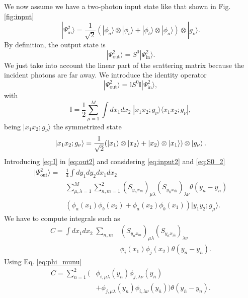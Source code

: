 \documentclass[notitlepage, prx, preprint, amsmath,superscriptaddress,amssymb]{revtex4-1}
\begin{document}
We now assume we have a two-photon input state like that shown in Fig. \ref{fig:input}
\begin{equation}\label{eq:input2}
|\Psi_\text{in}^2\rangle = \frac{1}{\sqrt{2}}(|\phi_a\rangle\otimes|\phi_b\rangle+|\phi_b\rangle\otimes|\phi_a\rangle)\otimes|g_\nu\rangle.
\end{equation}
By definition, the output state is
\begin{equation}
|\Psi_\text{out}^2\rangle = S^0|\Psi_\text{in}^2\rangle.
\end{equation}
We just take into account the linear part of the scattering matrix because the incident photons are far away. We introduce the identity operator
\begin{equation}\label{eq:out2}
|\Psi_\text{out}^2\rangle = \mathbb{I}S^0\mathbb{I}|\Psi_\text{in}^2\rangle,
\end{equation}
with
\begin{equation}\label{eq:I}
\mathbb{I}=\frac{1}{2}\sum_{\mu=1}^M \int dx_1dx_2\;|x_1x_2;g_\nu\rangle \langle x_1x_2;g_\nu|,
\end{equation}
being $|x_1x_2;g_\nu\rangle$ the symmetrized state
\begin{equation}
|x_1x_2;g_\nu\rangle=\frac{1}{\sqrt{2}}(|x_1\rangle\otimes|x_2\rangle + |x_2\rangle\otimes|x_1\rangle)\otimes \ket{g_\nu}.
\end{equation}
Introducing \eqref{eq:I} in \eqref{eq:out2} and considering \eqref{eq:input2} and \eqref{eq:S0_2}
\begin{align}\label{eq:out2_2}
|\Psi_\text{out}^2\rangle = &\frac{1}{4}\int dy_1dy_2dx_1dx_2\nonumber\\
&\sum_{\mu,\lambda=1}^M\sum_{n,m=1}^2(S_{y_nx_m})_{\mu\lambda} (S_{y_{\overline{n}}x_{\overline{m}}})_{\lambda\nu}\theta(y_{\overline{n}}-y_n)\nonumber\\
&(\phi_a(x_1)\phi_b(x_2)+\phi_a(x_2)\phi_b(x_1))|y_1y_2;g_\mu\rangle.
\end{align}
We have to compute integrals such as
\begin{align}
C=\int dx_1dx_2\;\sum_{n,m}&(S_{y_nx_m})_{\mu\lambda} (S_{y_{\overline{n}}x_{\overline{m}}})_{\lambda\nu}\nonumber\\
&\phi_i(x_1)\phi_j(x_2)\theta(y_{\overline{n}}-y_n).
\end{align}
Using Eq. \eqref{eq:phi_munu}
\begin{align}\label{eq:C1}
C=\sum_{n=1}^2(&\phi_{i,\mu\lambda}(y_n)\phi_{j,\lambda\nu}(y_{\overline{n}}) \nonumber\\
& + \phi_{j,\mu\lambda}(y_n)\phi_{i,\lambda\nu}(y_{\overline{n}}))\theta(y_{\overline{n}}-y_n).
\end{align}
\end{document}
